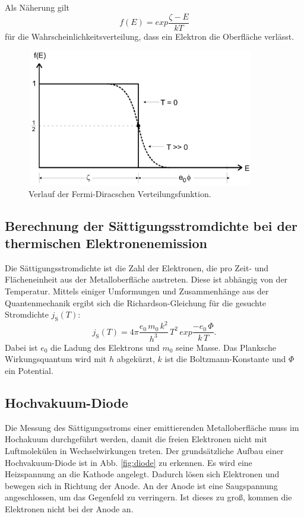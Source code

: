 \noindent Als Näherung gilt 
\begin{equation}
    f(E) = exp{\frac{\zeta - E}{k T}}
    \label{eqn:fermidirac}
\end{equation}
für die Wahrscheinlichkeitsverteilung, dass ein Elektron die 
Oberfläche  verlässt. 

\begin{figure}
    \centering
    \includegraphics[width=10cm, height=6cm]{build/fermidirac.png}
    \caption{Verlauf der Fermi-Diracschen Verteilungsfunktion. \cite{V504}}
    \label{fig:Fermidirac}
\end{figure}

\subsection{Berechnung der Sättigungsstromdichte bei der 
thermischen Elektronenemission}

Die Sättigungsstromdichte ist die Zahl der 
Elektronen, die pro Zeit- und Flächeneinheit aus der 
Metalloberfläche austreten. Diese ist abhängig von der 
Temperatur. Mittels einiger Umformungen und 
Zusammenhänge aus der Quantenmechanik ergibt sich die 
Richardson-Gleichung für die gesuchte Stromdichte $j_\text{S}(T)$:
\begin{equation}
    j_\text{S}(T)= 4 \pi \frac{e_0 \, m_0 \, k^2}{h^3} \, T^2 \, exp{\frac{-e_0 \, \Phi}{k \, T}}.
    \label{eqn:richardson}
\end{equation} 
Dabei ist $e_0$ die Ladung des Elektrons und $m_0$ seine Masse. 
Das Planksche Wirkungsquantum wird mit $h$ abgekürzt, $k$ ist 
die Boltzmann-Konstante und $\Phi$ ein Potential. %

\subsection{Hochvakuum-Diode}

Die Messung des Sättigungsstroms einer emittierenden 
Metalloberfläche muss im Hochakuum durchgeführt werden, 
damit die freien Elektronen nicht mit Luftmolekülen in 
Wechselwirkungen treten. Der grundsätzliche Aufbau einer 
Hochvakuum-Diode ist in Abb. \ref{fig:diode} zu erkennen.
Es wird eine Heizspannung an die Kathode angelegt. Dadurch 
lösen sich Elektronen und bewegen sich in Richtung der Anode. 
An der Anode ist eine Saugspannung angeschlossen, um das 
Gegenfeld zu verringern. Ist dieses zu groß, kommen die 
Elektronen nicht bei der Anode an. 

